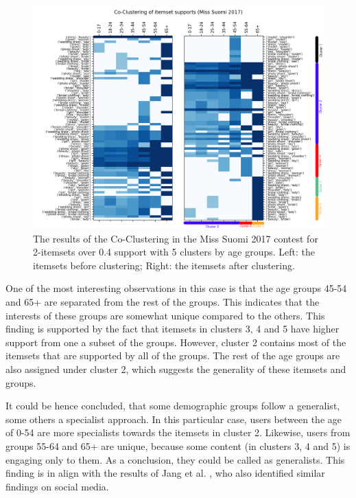 \begin{figure}[h] 
    \begin{center}
        \includegraphics[width=1.0\textwidth]{Images/coclustering_miss-suomi-age_group-2-itemsets-04_support.png}
        \caption{The results of the Co-Clustering in the Miss Suomi 2017 contest for 2-itemsets over 0.4 support with 5 clusters by age groups. Left: the itemsets before clustering; Right: the itemsets after clustering.}
        \label{coclustering_miss-suomi-age_group-2-itemsets-04_support}
    \end{center}
\end{figure}

One of the most interesting observations in this case is that the age groups 45-54 and 65+ are separated from the rest of the groups. This indicates that the interests of these groups are somewhat unique compared to the others. This finding is supported by the fact that itemsets in clusters 3, 4 and 5 have higher support from one a subset of the groups. However, cluster 2 contains most of the itemsets that are supported by all of the groups. The rest of the age groups are also assigned under cluster 2, which suggests the generality of these itemsets and groups. 

It could be hence concluded, that some demographic groups follow a generalist, some others a specialist approach. In this particular case, users between the age of 0-54 are more specialists towards the itemsets in cluster 2. Likewise, users from groups 55-64 and 65+ are unique, because some content (in clusters 3, 4 and 5) is engaging only to them. As a conclusion, they could be called as generalists. This finding is in align with the results of Jang et al. \cite{jang2015no}, who also identified similar findings on social media. 